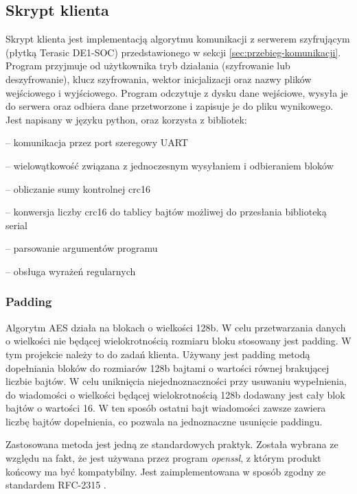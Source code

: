 \newpage
\subsection{Skrypt klienta}
Skrypt klienta jest implementacją algorytmu komunikacji z serwerem szyfrującym (płytką Terasic DE1-SOC) przedstawionego w sekcji \ref{sec:przebieg-komunikacji}. Program przyjmuje od użytkownika tryb działania (szyfrowanie lub deszyfrowanie), klucz szyfrowania, wektor inicjalizacji oraz nazwy plików wejściowego i wyjściowego. Program odczytuje z dysku dane wejściowe, wysyła je do serwera oraz odbiera dane przetworzone i zapisuje je do pliku wynikowego. Jest napisany w języku python, oraz korzysta z bibliotek:
\begin{description}[noitemsep]
\item[serial] -- komunikacja przez port szeregowy UART
\item[threading] -- wielowątkowość związana z jednoczesnym wysyłaniem i odbieraniem bloków
\item[crcmod] -- obliczanie sumy kontrolnej crc16
\item[struct] -- konwersja liczby crc16 do tablicy bajtów możliwej do przesłania biblioteką serial
\item[argparse] -- parsowanie argumentów programu
\item[re] -- obsługa wyrażeń regularnych
\end{description}

\subsubsection{Padding}
Algorytm AES działa na blokach o wielkości 128b. W celu przetwarzania danych o wielkości nie będącej wielokrotnością rozmiaru bloku stosowany jest padding. W tym projekcie należy to do zadań klienta. Używany jest padding metodą dopełniania bloków do rozmiarów 128b bajtami o wartości równej brakującej liczbie bajtów. W celu uniknięcia niejednoznaczności przy usuwaniu wypełnienia, do wiadomości o wielkości będącej wielokrotnością 128b dodawany jest cały blok bajtów o wartości 16. W ten sposób ostatni bajt wiadomości zawsze zawiera liczbę bajtów dopełnienia, co pozwala na jednoznaczne usunięcie paddingu. 

Zastosowana metoda jest jedną ze standardowych praktyk. Została wybrana ze względu na fakt, że jest używana przez program \textit{openssl}, z którym produkt końcowy ma być kompatybilny. Jest zaimplementowana w sposób zgodny ze standardem RFC-2315 \cite{padding-rfc}.
